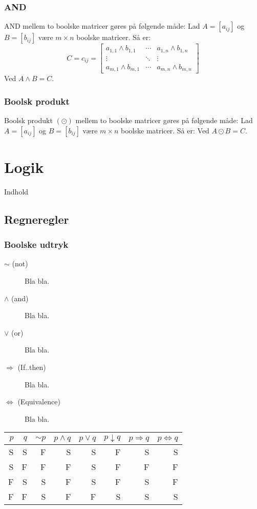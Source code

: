 \documentclass[a4paper]{article}
\begin{document}
    \subsubsection{AND}
      AND mellem to boolske matricer gøres på følgende måde:
      Lad $A = [a_{ij}]$ og $B= [b_{ij}]$ være $m \times n$ boolske matricer. Så er:
      \begin{equation}
        C = c_{ij} = \begin{bmatrix}
                    a_{1,1} \wedge b_{1,1} & \cdots & a_{1,n} \wedge b_{1,n} \\
                    \vdots               & \ddots & \vdots \\
                    a_{m,1} \wedge b_{m,1} & \cdots & a_{m,n} \wedge b_{m,n}
                  \end{bmatrix}
      \end{equation}
      Ved $A \wedge B = C$.
    \subsubsection{Boolsk produkt} %
      Boolsk produkt $(\odot)$ mellem to boolske matricer gøres på følgende måde:
      Lad $A = [a_{ij}]$ og $B= [b_{ij}]$ være $m \times n$ boolske matricer. Så er:
      Ved $A \odot B = C$.
\section{Logik}
  Indhold
  \subsection{Regneregler}
    \subsubsection{Boolske udtryk}
      \begin{description}
        \item[$\sim$ (not)] Bla bla.
        \item[$\wedge$ (and)] Bla bla.
        \item[$\vee$ (or)]  Bla bla.
        \item[$\Rightarrow$ (If..then)]  Bla bla.
        \item[$\Leftrightarrow$ (Equivalence)]  Bla bla.
      \end{description}
      \begin{center}
        \begin{tabular} {|r|r||r|r|r|r|r|r|}
          \hline
          $p$ & $q$  & $\sim{}p$ &  $p\wedge{}q$ &  $p\vee{}q$ &  $p\downarrow{}q$  &  $p\Rightarrow{}q$  &  $p\Leftrightarrow{}q$ \\
          \hline
          \hline
          S&S&F&S&S&F&S&S\\
          \hline
          S&F&F&F&S&F&F&F\\
          \hline
          F&S&S&F&S&F&S&F\\
          \hline
          F&F&S&F&F&S&S&S\\
          \hline
        \end{tabular}
      \end{center}
\end{document}
